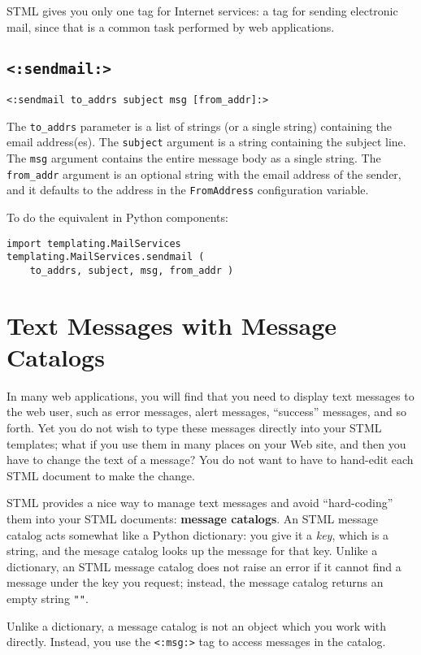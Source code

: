 \documentclass{manual}
\begin{document}
{{STML gives you only one tag for Internet services:
a tag for sending electronic mail, since that is
a common task performed by web applications.

\section{\texttt{<:sendmail:>}}
\label{tagsendmail}
\texttt{<:sendmail to_addrs subject msg [from_addr]:>}

The \texttt{to_addrs} parameter is a list of strings 
(or a single string) containing the email address(es). The
\texttt{subject} argument is a 
string containing the subject line. The \texttt{msg} argument contains
the entire message body as a single string. The \texttt{from_addr} argument
is an optional string with the email address of the sender, 
and it defaults to the address in the
\texttt{FromAddress} configuration variable.


To do the equivalent in Python components:
\begin{verbatim}
import templating.MailServices
templating.MailServices.sendmail ( 
    to_addrs, subject, msg, from_addr )
\end{verbatim}


\chapter{Text Messages with Message Catalogs}
\label{stmlrefmsg}
In many web applications, you will find that you need
to display text messages to the web user, such as 
error messages, alert messages, ``success'' messages,
and so forth. Yet you do not wish to type these messages
directly into your STML templates; what if you use them
in many places on your Web site, and then you have to
change the text of a message? You do not want to have
to hand-edit each STML document to make the change.

STML provides a nice way to manage text messages
and avoid ``hard-coding'' them into your STML documents:
\textbf{message catalogs}. An STML message catalog acts somewhat
like a Python dictionary: you give it a \emph{key},
which is a string, and the mesage catalog looks up
the message for that key. Unlike a dictionary, an STML
message catalog does not raise an error if it cannot
find a message under the key you request; instead,
the message catalog returns an empty string \texttt{""}.

Unlike a dictionary, a message catalog is not an object
which you work with directly. Instead,
you use the \texttt{<:msg:>} tag to access messages
in the catalog.

}}
\end{document}
